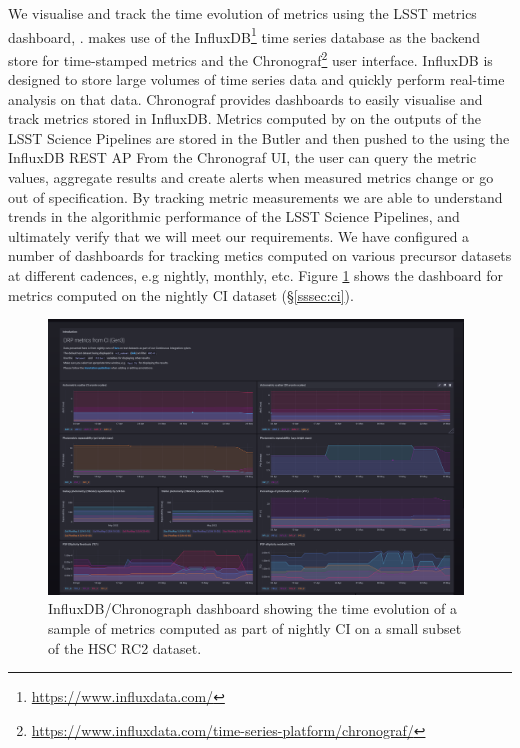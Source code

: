 We visualise and track the time evolution of \faro metrics using the LSST metrics dashboard, \squash\cite{SQR-009}. 
\squash makes use of the InfluxDB\footnote{\url{https://www.influxdata.com/}} time series database as the backend store for time-stamped metrics and the Chronograf\footnote{\url{https://www.influxdata.com/time-series-platform/chronograf/}} user interface.
InfluxDB is designed to store large volumes of time series data and quickly perform real-time analysis on that data.
Chronograf provides dashboards to easily visualise and track metrics stored in InfluxDB. 
Metrics computed by \faro on the outputs of the LSST Science Pipelines are stored in the Butler and then pushed to the \squash using  the InfluxDB REST AP
From the Chronograf UI, the user can query the metric values, aggregate results and create alerts when measured metrics change or go out of specification. 
By tracking metric measurements we are able to understand trends in the algorithmic performance of the LSST Science Pipelines, and ultimately verify that we will meet our requirements.
We have configured a number of dashboards for tracking \faro metics computed on various precursor datasets at different cadences, e.g nightly, monthly, etc. 
Figure \ref{fig:squash_metrics_ci} shows the dashboard for \faro metrics computed on the nightly CI dataset (\S \ref{sssec:ci}). 
\begin{figure}[!htp]
  \par\medskip 
  \includegraphics[width=0.98\textwidth]{figures/squash-dashboard-ci.png}
  \par\medskip   
  \caption{InfluxDB/Chronograph dashboard showing the time evolution of a sample of metrics computed as part of nightly CI on a small subset of the HSC RC2 dataset.}
  \label{fig:squash_metrics_ci}
\end{figure}


